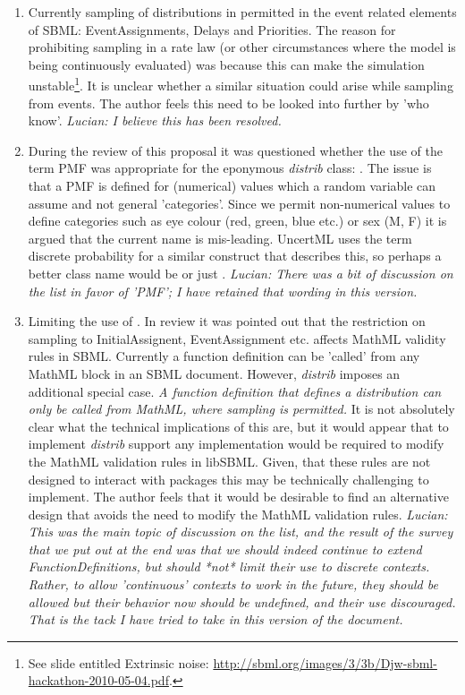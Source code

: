 \documentclass[draftspec]{sbmlpkgspec}
\newcommand{\distribshort}{\emph{distrib}\xspace}
\newcommand{\mathml}{MathML\xspace}
\newcommand{\uncertml}{UncertML\xspace}
\begin{document}
\begin{enumerate}
\item Currently sampling of distributions in permitted in the event
  related elements of SBML: EventAssignments, Delays and
  Priorities. The reason for prohibiting sampling in a rate law (or other
  circumstances where the model is being continuously evaluated) was
  because this can make the simulation unstable\footnote{See slide entitled Extrinsic
  noise:
  \url{http://sbml.org/images/3/3b/Djw-sbml-hackathon-2010-05-04.pdf}.}. It
  is unclear whether a similar situation could arise while sampling from
  events. The author feels this need to be looked into further by 'who
  know'.
  \emph{Lucian:  I believe this has been resolved.}

\item During the review of this proposal it was questioned whether the
  use of the term PMF was appropriate for the eponymous \distribshort
  class: . The issue is that a PMF is defined
  for (numerical) values which a random variable can assume and not
  general 'categories'. Since we permit non-numerical values to define
  categories such as eye colour (red, green, blue etc.) or sex (M, F)
  it is argued that the current name is mis-leading. \uncertml uses
  the term discrete probability for a similar construct that describes
  this, so perhaps a better class name would be
   or just
  .
  \emph{Lucian:  There was a bit of discussion on the list in favor of 'PMF'; I have retained that wording in this version.}

\item Limiting the use of . In review it was
  pointed out that the restriction on sampling to InitialAssignent,
  EventAssignment etc. affects MathML validity rules in SBML. Currently
  a function definition can be 'called' from any \mathml block in an
  SBML document. However, \distribshort imposes an additional special
  case. \emph{A function definition that defines a distribution can
    only be called from \mathml, where sampling is permitted.} It is
  not absolutely clear what the technical implications of this are,
  but it would appear that to implement \distribshort support any
  implementation would be required to modify the \mathml validation
  rules in libSBML. Given, that these rules are not designed to
  interact with packages this may be technically challenging to
  implement. The author feels that it would be desirable to find an
  alternative design that avoids the need to modify the \mathml
  validation rules.
  \emph{Lucian:  This was the main topic of discussion on the list, and the result of the survey that we put out at the end was that we should indeed continue to extend FunctionDefinitions, but should *not* limit their use to discrete contexts.  Rather, to allow 'continuous' contexts to work in the future, they should be allowed but their behavior now should be undefined, and their use discouraged.  That is the tack I have tried to take in this version of the document.}
\end{enumerate}
\end{document}

